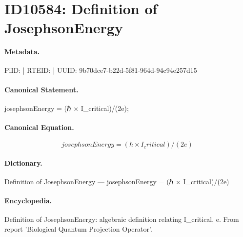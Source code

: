 \section*{ID10584: Definition of JosephsonEnergy}
\paragraph{Metadata.}
PiID:  | RTEID:  | UUID: 9b70dce7-b22d-5f81-964d-94c94e257d15

\paragraph{Canonical Statement.}
josephsonEnergy = (ℏ × I\_critical)/(2e);

\paragraph{Canonical Equation.}
\[
josephsonEnergy = (ℏ × I_critical)/(2e)
\]

\paragraph{Dictionary.}
Definition of JosephsonEnergy — josephsonEnergy = (ℏ × I\_critical)/(2e)

\paragraph{Encyclopedia.}
Definition of JosephsonEnergy: algebraic definition relating I\_critical, e. From report 'Biological Quantum Projection Operator'.
